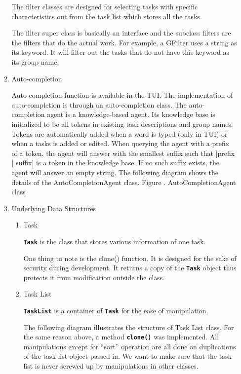 \documentclass[12pt, a4paper]{article}
\newcommand{\cmdinline}[1]{{\bf \texttt{#1}}}
\begin{document}
\begin{enumerate}
\begin{enumerate}
The filter classes are designed for selecting tasks with specific characteristics out from the
task list which stores all the tasks.

The filter super class is basically an interface and the subclass filters are the filters that do the
actual work. For example, a GFilter uses a string as its keyword. It will filter out the tasks that
do not have this keyword as its group name.

\item Auto-completion

Auto-completion function is available in the TUI. The implementation of auto-completion is
through an auto-completion class. The auto-completion agent is a knowledge-based agent.
Its knowledge base is initialized to be all tokens in existing task descriptions and group names.
Tokens are automatically added when a word is typed (only in TUI) or when a tasks is added
or edited. When querying the agent with a prefix of a token, the agent will answer with the
smallest suffix such that [prefix | suffix] is a token in the knowledge base. If no such suffix
exists, the agent will answer an empty string.
The following diagram shows the details of the AutoCompletionAgent class.
Figure . AutoCompletionAgent class

\item Underlying Data Structures
\begin{enumerate}
\item Task

\cmdinline{Task} is the class that stores various information of one task.

One thing to note is the clone() function. It is designed for the
sake of security during development. It returns a copy of the \cmdinline{Task} object thus protects it from modification outside the class.

\item Task List

\cmdinline{TaskList} is a container of \cmdinline{Task} for the ease of manipulation.

The following diagram illustrates the structure of Task List class.
For the same reason above, a method \cmdinline{clone()} was implemented. All manipulations except for ``sort'' operation
are all done on duplications of the task list object passed in. We want to make sure that the task list is never screwed up by manipulations in other classes.
\end{enumerate}
\end{enumerate}
\end{enumerate}
\end{document}
